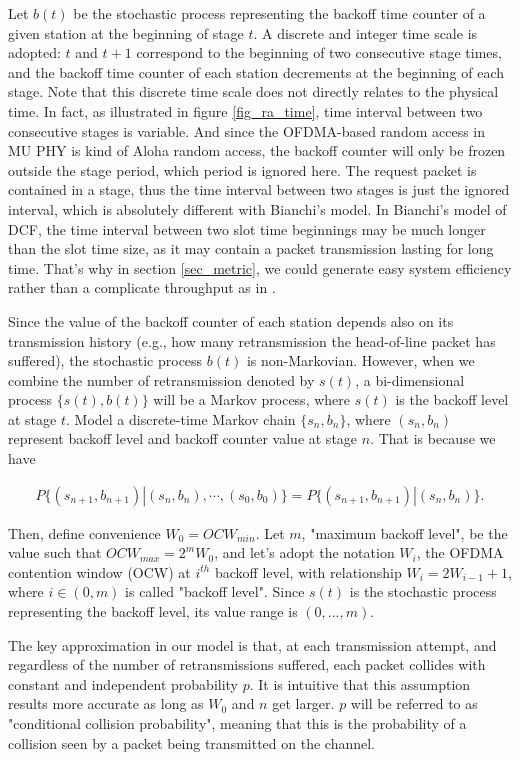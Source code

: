 Let $b(t)$ be the stochastic process representing the backoff time counter of a given station at the beginning of stage $t$.
A discrete and integer time scale is adopted: $t$ and $t+1$ correspond to the beginning of two consecutive stage times, and the backoff time counter of each station decrements at the beginning of each stage.
Note that this discrete time scale does not directly relates to the physical time.
In fact, as illustrated in figure \ref{fig_ra_time}, time interval between two consecutive stages is variable.
And since the OFDMA-based random access in MU PHY is kind of Aloha random access, the backoff counter will only be frozen outside the stage period, which period is ignored here. 
The request packet is contained in a stage, thus the time interval between two stages is just the ignored interval, which is absolutely different with Bianchi's model.
In Bianchi's model of DCF, the time interval between two slot time beginnings may be much longer than the slot time size, as it may contain a packet transmission lasting for long time. 
That's why in section \ref{sec_metric}, we could generate easy system efficiency rather than a complicate throughput as in \cite{bianchi2000performance}.

Since the value of the backoff counter of each station depends also on its transmission history (e.g., how many retransmission the head-of-line packet has suffered), the stochastic process $b(t)$ is non-Markovian. 
However, when we combine the number of retransmission denoted by $s(t)$, a bi-dimensional process $\lbrace s(t), b(t)\rbrace$ will be a Markov process, where $s(t)$ is the backoff level at stage $t$. 
Model a discrete-time Markov chain $\lbrace s_n, b_n\rbrace$, where $(s_n,b_n)$ represent backoff level and backoff counter value at stage $n$.
That is because we have  

\begin{align}
P\lbrace (s_{n+1},b_{n+1})| (s_n,b_n),\cdots,(s_0,b_0)\rbrace = P\lbrace (s_{n+1},b_{n+1})|(s_n,b_n) \rbrace.
\end{align}

Then, define convenience $W_0=OCW_{min}$. 
Let $m$, "maximum backoff level", be the value such that $OCW_{max}=2^mW_0$, and let's adopt the notation $W_i$, the OFDMA contention window (OCW) at $i^{th}$ backoff level, with relationship $W_i = 2W_{i-1}+1$, where $i\in (0,m)$ is called "backoff level".
Since $s(t)$ is the stochastic process representing the backoff level, its value range is $(0,...,m)$.


The key approximation in our model is that, at each transmission attempt, and regardless of the number of retransmissions suffered, each packet collides with constant and independent probability $p$. It is intuitive that this assumption results more accurate as long as $W_0$ and $n$ get larger. $p$ will be referred to as "conditional collision probability", meaning that this is the probability of a collision seen by a packet being transmitted on the channel.


